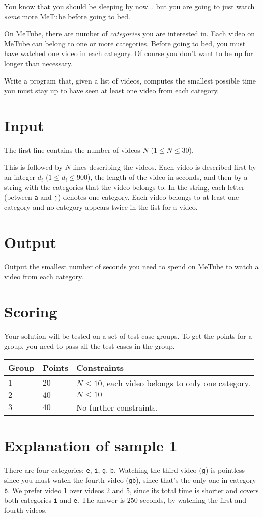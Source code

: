 You know that you should be sleeping by now... but you are going to just watch \emph{some} more MeTube before going to bed.

On MeTube, there are number of \emph{categories} you are interested in.
Each video on MeTube can belong to one or more categories.
Before going to bed, you must have watched one video in each category.
Of course you don't want to be up for longer than necessary.

Write a program that, given a list of videos, computes the smallest possible time you must stay up to have seen at least one video from each category.

\section*{Input}
The first line contains the number of videos $N$ ($1 \le N \le 30$).

This is followed by $N$ lines describing the videos.
Each video is described first by an integer $d_i$ ($1 \le d_i \le 900$), the length of the video in seconds, and then by a string with the categories that the video belongs to.
In the string, each letter (between \texttt{a} and \texttt{j}) denotes one category.
Each video belongs to at least one category and no category appears twice in the list for a video.

\section*{Output}
Output the smallest number of seconds you need to spend on MeTube to watch a video from each category.

\section*{Scoring}
Your solution will be tested on a set of test case groups.
To get the points for a group, you need to pass all the test cases in the group.

\noindent
\begin{tabular}{| l | l | p{10cm} |}
\hline
Group & Points & Constraints \\ \hline
  $1$    & $20$        & $N \le 10$, each video belongs to only one category. \\ \hline 
  $2$    & $40$        & $N \le 10$ \\ \hline
  $3$    & $40$        & No further constraints. \\ \hline 
\end{tabular}

\section*{Explanation of sample 1}
There are four categories: \texttt e, \texttt i, \texttt g, \texttt b.
Watching the third video (\texttt{g}) is pointless since you must watch the fourth video (\texttt{gb}), since that's the only one in category \texttt{b}.
We prefer video $1$ over videos $2$ and $5$, since its total time is shorter and covers both categories \texttt{i} and \texttt{e}.
The answer is $250$ seconds, by watching the first and fourth videos.

